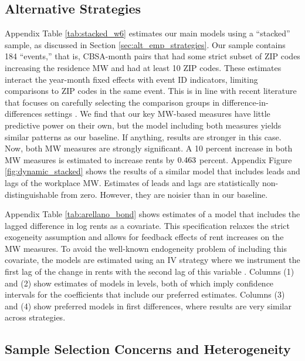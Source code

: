 \subsection{Alternative Strategies}
\label{sec:results_alternative_strategies}

Appendix Table \ref{tab:stacked_w6} estimates our main models using a 
``stacked'' sample, as discussed in Section \ref{sec:alt_emp_strategies}.
Our sample contains 184 ``events,'' that is, CBSA-month pairs that had some 
strict subset of ZIP codes increasing the residence MW and had at least 10
ZIP codes.
These estimates interact the year-month fixed effects with event ID indicators, 
limiting comparisons to ZIP codes in the same event.
This is in line with recent literature that focuses on carefully selecting the 
comparison groups in difference-in-differences settings
\parencite{deChaisemartinEtAl2022, RothEtAl2022}.
We find that our key MW-based measures have little predictive power on their own,
but the model including both measures yields similar patterns as our baseline.
If anything, results are stronger in this case.
Now, both MW measures are strongly significant.
A 10 percent increase in both MW measures is estimated to increase rents 
by $\textnormal{0.463}$ percent.
Appendix Figure \ref{fig:dynamic_stacked} shows the results of a similar model 
that includes leads and lags of the workplace MW.
Estimates of leads and lags are statistically non-distinguishable from zero.
However, they are noisier than in our baseline.

Appendix Table \ref{tab:arellano_bond} shows estimates of a model that includes
the lagged difference in log rents as a covariate.
This specification relaxes the strict exogeneity assumption and allows for 
feedback effects of rent increases on the MW measures.
To avoid the well-known endogeneity problem of including this covariate, the 
models are estimated using an IV strategy where we instrument the first lag of 
the change in rents with the second lag of this variable 
\parencite{ArellanoBond1991, ArellanoHonore2001}.
Columns (1) and (2) show estimates of models in levels, both of which imply
confidence intervals for the coefficients that include our preferred estimates.
Columns (3) and (4) show preferred models in first differences, where results
are very similar across strategies. 

\subsection{Sample Selection Concerns and Heterogeneity}
\label{sec:results_heterogeneity}

